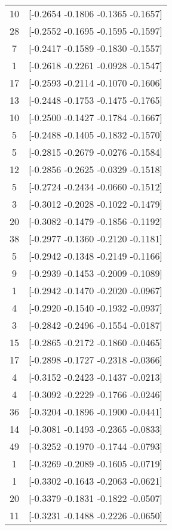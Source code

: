\documentclass[12pt, fullpage,letterpaper]{article}
\begin{document}
\begin{enumerate}
\begin{enumerate}
{\begin{longtable}{|c|c|}
			 10 &  [-0.2654 -0.1806 -0.1365 -0.1657] \\
			 28 &  [-0.2552 -0.1695 -0.1595 -0.1597] \\
			  7 &  [-0.2417 -0.1589 -0.1830 -0.1557] \\
			  1 &  [-0.2618 -0.2261 -0.0928 -0.1547] \\
			 17 &  [-0.2593 -0.2114 -0.1070 -0.1606] \\
			 13 &  [-0.2448 -0.1753 -0.1475 -0.1765] \\
			 10 &  [-0.2500 -0.1427 -0.1784 -0.1667] \\
			  5 &  [-0.2488 -0.1405 -0.1832 -0.1570] \\
			  5 &  [-0.2815 -0.2679 -0.0276 -0.1584] \\
			 12 &  [-0.2856 -0.2625 -0.0329 -0.1518] \\
			  5 &  [-0.2724 -0.2434 -0.0660 -0.1512] \\
			  3 &  [-0.3012 -0.2028 -0.1022 -0.1479] \\
			 20 &  [-0.3082 -0.1479 -0.1856 -0.1192] \\
			 38 &  [-0.2977 -0.1360 -0.2120 -0.1181] \\
			  5 &  [-0.2942 -0.1348 -0.2149 -0.1166] \\
			  9 &  [-0.2939 -0.1453 -0.2009 -0.1089] \\
			  1 &  [-0.2942 -0.1470 -0.2020 -0.0967] \\
			  4 &  [-0.2920 -0.1540 -0.1932 -0.0937] \\
			  3 &  [-0.2842 -0.2496 -0.1554 -0.0187] \\
			 15 &  [-0.2865 -0.2172 -0.1860 -0.0465] \\
			 17 &  [-0.2898 -0.1727 -0.2318 -0.0366] \\
			  4 &  [-0.3152 -0.2423 -0.1437 -0.0213] \\
			  4 &  [-0.3092 -0.2229 -0.1766 -0.0246] \\
			 36 &  [-0.3204 -0.1896 -0.1900 -0.0441] \\
			 14 &  [-0.3081 -0.1493 -0.2365 -0.0833] \\
			 49 &  [-0.3252 -0.1970 -0.1744 -0.0793] \\
			  1 &  [-0.3269 -0.2089 -0.1605 -0.0719] \\
			  1 &  [-0.3302 -0.1643 -0.2063 -0.0621] \\
			 20 &  [-0.3379 -0.1831 -0.1822 -0.0507] \\
			 11 &  [-0.3231 -0.1488 -0.2226 -0.0650] \\

\end{longtable}}
\end{enumerate}
\end{enumerate}
\end{document}
